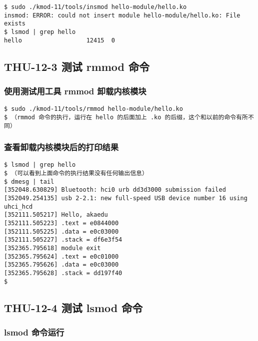 \documentclass[11pt,a4paper]{article}
\begin{document}
{\begin{shaded}\begin{verbatim}
$ sudo ./kmod-11/tools/insmod hello-module/hello.ko 
insmod: ERROR: could not insert module hello-module/hello.ko: File exists
$ lsmod | grep hello
hello                  12415  0 
\end{verbatim}\end{shaded}}
\subsection{THU-12-3 测试 rmmod 命令}

\subsubsection{使用测试用工具 rmmod 卸载内核模块}

{\begin{shaded}\begin{verbatim}
$ sudo ./kmod-11/tools/rmmod hello-module/hello.ko
$ （rmmod 命令的执行，运行在 hello 的后面加上 .ko 的后缀，这个和以前的命令有所不同）
\end{verbatim}\end{shaded}}
\subsubsection{查看卸载内核模块后的打印结果}

{\begin{shaded}\begin{verbatim}
$ lsmod | grep hello
$ （可以看到上面命令的执行结果没有任何输出信息）
$ dmesg | tail
[352048.630829] Bluetooth: hci0 urb dd3d3000 submission failed
[352049.254135] usb 2-2.1: new full-speed USB device number 16 using uhci_hcd
[352111.505217] Hello, akaedu
[352111.505223] .text = e0844000
[352111.505225] .data = e0c03000
[352111.505227] .stack = df6e3f54
[352365.795618] module exit
[352365.795624] .text = e0c01000
[352365.795626] .data = e0c03000
[352365.795628] .stack = dd197f40
$ 
\end{verbatim}\end{shaded}}
\subsection{THU-12-4 测试 lsmod 命令}

\subsubsection{lsmod 命令运行}
\end{document}

